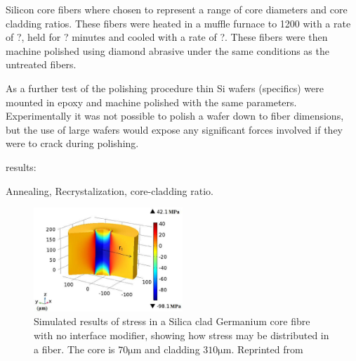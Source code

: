 Silicon core fibers where chosen to represent a range of core diameters and core cladding ratios. These fibers were heated in a muffle furnace to 1200 with a rate of ?, held for ? minutes and cooled with a  rate of ?. These fibers were then machine polished using diamond abrasive under the same conditions as the untreated fibers. 

As a further test of the polishing procedure thin Si wafers (specifics) were mounted in epoxy and machine polished with the same parameters. Experimentally it was not possible to polish a wafer down to fiber dimensions, but the use of large wafers would expose any significant forces involved if they were to crack during polishing.

results: 


Annealing, Recrystalization, core-cladding ratio. %

\begin{figure}[h]
    \centering
    \includegraphics[width=0.5\textwidth]{fig/polishing/stress_simulation.png}
    \caption{Simulated results of stress in a Silica clad Germanium core fibre with no interface modifier, showing how stress may be distributed in a fiber. The core is $70\si{\micro\meter}$ and cladding $310\si{\micro\meter}$. Reprinted from \cite{Zhao2017EffectFiber}}
    \label{fig:my_label}
\end{figure}


